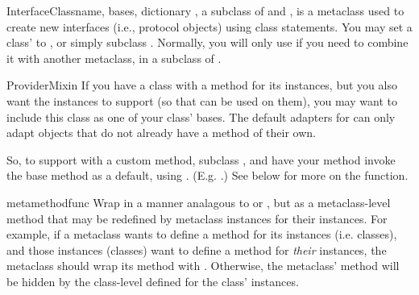 \begin{verbatim%
}
\begin{verbatim%
}
\begin{verbatim%
}
\begin{verbatim%
}
\begin{classdesc}{InterfaceClass}{name, bases, dictionary}
, a subclass of  and , is a
metaclass used to create new interfaces (i.e., protocol objects) using class
statements.  You may set a class'  to
, or simply subclass .  Normally, you
will only use  if you need to combine it with another
metaclass, in a subclass of .
\end{classdesc}














\begin{classdesc*}{ProviderMixin}
If you have a class with a  method for its instances, but
you also want the instances to support  (so that
 can be used on them), you may want to include this
class as one of your class' bases.  The default adapters for
 can only adapt objects that do not already have a
 method of their own.

So, to support  with a custom 
method, subclass , and have your 
method invoke the base  method as a default, using
.  (E.g. .)  See below for more on
the  function.
\end{classdesc*}


\begin{funcdesc}{metamethod}{func}
Wrap  in a manner analagous to  or
, but as a metaclass-level method that may be redefined
by metaclass instances for their instances.  For example, if a metaclass wants
to define a  method for its instances (i.e. classes), and
those instances (classes) want to define a  method for
\emph{their} instances, the metaclass should wrap its 
method with .  Otherwise, the metaclass'
 method will be hidden by the class-level
 defined for the class' instances.
\end{funcdesc}



\end{verbatim%
}
\end{verbatim%
}
\end{verbatim%
}
\end{verbatim%
}
